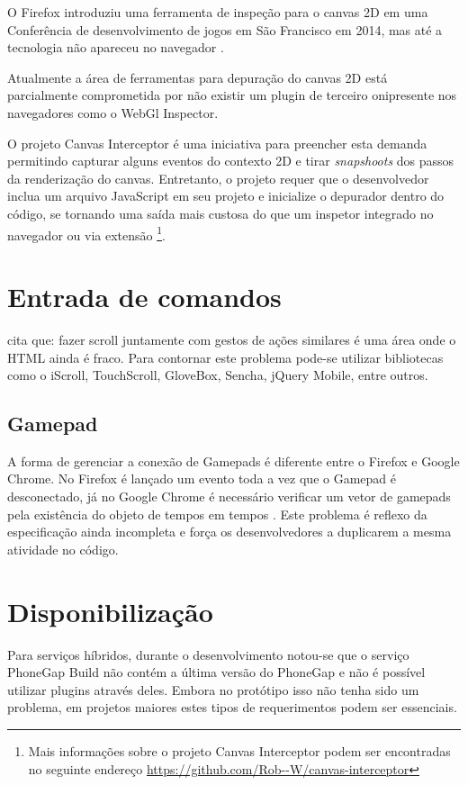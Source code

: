 O Firefox introduziu uma ferramenta de inspeção para o canvas 2D
em uma Conferência de desenvolvimento de jogos em São Francisco em 2014,
mas até a tecnologia não apareceu no navegador \autocite{firefoxCanvasDebug}.

Atualmente a área de ferramentas para depuração do canvas 2D está
parcialmente comprometida por não existir um plugin de terceiro
onipresente nos navegadores como o WebGl Inspector.

O projeto Canvas Interceptor é uma iniciativa para preencher
esta demanda permitindo capturar alguns eventos do contexto 2D e
tirar \textit{snapshoots} dos passos da renderização do canvas.
Entretanto, o projeto requer que o desenvolvedor inclua um arquivo
JavaScript em seu projeto e inicialize o depurador dentro do código,
se tornando uma saída mais custosa do que um inspetor integrado
no navegador ou via extensão \footnote{Mais informações sobre o
projeto Canvas Interceptor podem ser encontradas no seguinte endereço
\url{https://github.com/Rob--W/canvas-interceptor}}.

\section{Entrada de comandos}

\citet[p. 9]{aSeriousContender} cita que: fazer scroll juntamente
com gestos de ações similares é uma área onde o HTML ainda é
fraco. Para contornar este problema pode-se utilizar bibliotecas como o
iScroll, TouchScroll, GloveBox, Sencha, jQuery Mobile, entre outros.

\subsection{Gamepad}

A forma de gerenciar a conexão de Gamepads é diferente entre o Firefox
e Google Chrome. No Firefox é lançado um evento toda a vez que o
Gamepad é desconectado, já no Google Chrome é necessário verificar
um vetor de gamepads pela existência do objeto de tempos em tempos \autocite{gamepad}.
Este problema é reflexo da especificação ainda incompleta e força os
desenvolvedores a duplicarem a mesma atividade no código.

\section{Disponibilização}

Para serviços híbridos, durante o desenvolvimento notou-se que o
serviço PhoneGap Build não contém a última versão do PhoneGap e
não é possível utilizar plugins através deles. Embora no protótipo
isso não tenha sido um problema, em projetos maiores estes tipos de
requerimentos podem ser essenciais.

